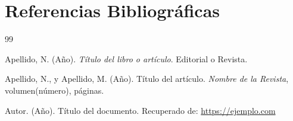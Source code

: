 \section{Referencias Bibliográficas}
\label{sec:referencias}

\begin{thebibliography}{99}

Apellido, N. (Año). \textit{Título del libro o artículo}. Editorial o Revista.

Apellido, N., y Apellido, M. (Año). Título del artículo. \textit{Nombre de la Revista}, volumen(número), páginas.

Autor. (Año). Título del documento. Recuperado de: \url{https://ejemplo.com}

\end{thebibliography}
